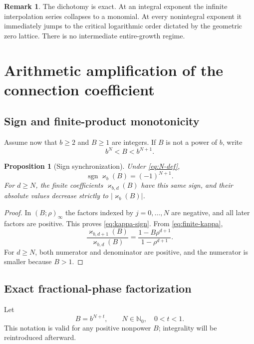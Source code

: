 \documentclass[11pt]{article}
\newtheorem{proposition}[theorem]{Proposition}
\theoremstyle{definition}
\newtheorem{remark}[theorem]{Remark}
\newcommand{\kk}{\varkappa}
\newcommand{\N}{\mathbb{N}}
\newcommand{\qpi}[2]{\left(#1;#2\right)_{\!\infty}}
\newcommand{\sgn}{\operatorname{sgn}}
\begin{document}
\begin{remark}
The dichotomy is exact.  At an integral exponent the infinite interpolation series collapses to a monomial.  At every nonintegral exponent it immediately jumps to the critical logarithmic order dictated by the geometric zero lattice.  There is no intermediate entire-growth regime.
\end{remark}

\section{Arithmetic amplification of the connection coefficient}

\subsection{Sign and finite-product monotonicity}

Assume now that $b\ge2$ and $B\ge1$ are integers.  If $B$ is not a power of $b$, write
\begin{equation}\label{eq:N-def}
 b^N<B<b^{N+1}.
\end{equation}

\begin{proposition}[Sign synchronization]\label{prop:kappa-sign}
Under \eqref{eq:N-def},
\begin{equation}\label{eq:kappa-sign}
 \sgn\kk_b(B)=(-1)^{N+1}.
\end{equation}
For $d\ge N$, the finite coefficients $\kk_{b,d}(B)$ have this same sign, and their absolute values decrease strictly to $|\kk_b(B)|$.
\end{proposition}

\begin{proof}
In $\qpi{B}{\rho}$ the factors indexed by $j=0,\dots,N$ are negative, and all later factors are positive.  This proves \eqref{eq:kappa-sign}.  From \eqref{eq:finite-kappa},
\[
 \frac{\kk_{b,d+1}(B)}{\kk_{b,d}(B)}
 =\frac{1-B\rho^{d+1}}{1-\rho^{d+1}}.
\]
For $d\ge N$, both numerator and denominator are positive, and the numerator is smaller because $B>1$.
\end{proof}

\subsection{Exact fractional-phase factorization}

Let
\[
 B=b^{N+t},\qquad N\in\N_0,\quad 0<t<1.
\]
This notation is valid for any positive nonpower $B$; integrality will be reintroduced afterward.
\end{document}
